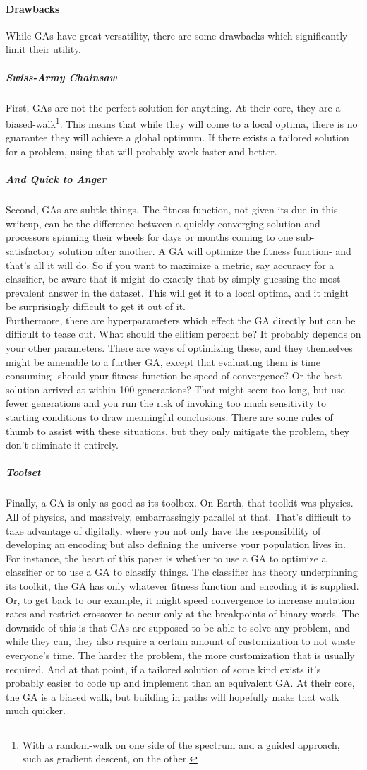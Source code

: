 \paragraph{Drawbacks}
While GAs have great versatility, there are some drawbacks which significantly limit their utility.
\subparagraph{Swiss-Army Chainsaw}
First, GAs are not the perfect solution for anything.  At their core, they are a biased-walk\footnote{With a random-walk on one side of the spectrum and a guided approach, such as gradient descent, on the other.}.  This means that while they will come to a local optima, there is no guarantee they will achieve a global optimum.  If there exists a tailored solution for a problem, using that will probably work faster and better.
\subparagraph{And Quick to Anger}
Second, GAs are subtle things.  The fitness function, not given its due in this writeup, can be the difference between a quickly converging solution and processors spinning their wheels for days or months coming to one sub-satisfactory solution after another.  A GA will optimize the fitness function- and that's all it will do.  So if you want to maximize a metric, say accuracy for a classifier, be aware that it might do exactly that by simply guessing the most prevalent answer in the dataset.  This will get it to a local optima, and it might be surprisingly difficult to get it out of it.\\
Furthermore, there are hyperparameters which effect the GA directly but can be difficult to tease out.  What should the elitism percent be?  It probably depends on your other parameters.  There are ways of optimizing these, and they themselves might be amenable to a further GA, except that evaluating them is time consuming- should your fitness function be speed of convergence?  Or the best solution arrived at within 100 generations?  That might seem too long, but use fewer generations and you run the risk of invoking too much sensitivity to starting conditions to draw meaningful conclusions.  There are some rules of thumb to assist with these situations, but they only mitigate the problem, they don't eliminate it entirely.
\subparagraph{Toolset}
Finally, a GA is only as good as its toolbox.  On Earth, that toolkit was physics.  All of physics, and massively, embarrassingly parallel at that.  That's difficult to take advantage of digitally, where you not only have the responsibility of developing an encoding but also defining the universe your population lives in.  For instance, the heart of this paper is whether to use a GA to optimize a classifier or to use a GA to classify things.  The classifier has theory underpinning its toolkit, the GA has only whatever fitness function and encoding it is supplied.  Or, to get back to our example, it might speed convergence to increase mutation rates and restrict crossover to occur only at the breakpoints of binary words.  The downside of this is that GAs are supposed to be able to solve any problem, and while they can, they also require a certain amount of customization to not waste everyone's time.  The harder the problem, the more customization that is usually required.  And at that point, if a tailored solution of some kind exists it's probably easier to code up and implement than an equivalent GA.  At their core, the GA is a biased walk, but building in paths will hopefully make that walk much quicker.
